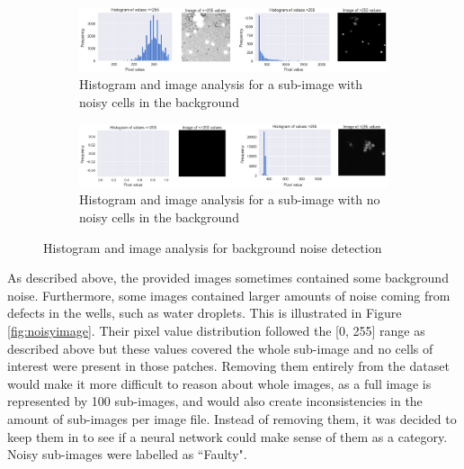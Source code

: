 \begin{figure}[h!]
    \centering
    \begin{subfigure}[h!]{0.99\textwidth}
        \includegraphics[width=\textwidth]{dissertation/figures/background_noise_true.png}
        \caption{Histogram and image analysis for a sub-image with noisy cells in the background}
        \label{fig:bgnoisetrue}
    \end{subfigure}

    \begin{subfigure}[h!]{0.99\textwidth}
        \includegraphics[width=\textwidth]{dissertation/figures/background_noise_false.png}
        \caption{Histogram and image analysis for a sub-image with no noisy cells in the background}
        \label{fig:bgnoisefalse}
    \end{subfigure}

    \caption{Histogram and image analysis for background noise detection}
    \label{fig:bgnoise}

\end{figure}

As described above, the provided images sometimes contained some background noise. Furthermore, some images contained larger amounts of noise coming from defects in the wells, such as water droplets. This is illustrated in Figure \ref{fig:noisyimage}. Their pixel value distribution followed the [0, 255] range as described above but these values covered the whole sub-image and no cells of interest were present in those patches. Removing them entirely from the dataset would make it more difficult to reason about whole images, as a full image is represented by 100 sub-images, and would also create inconsistencies in the amount of sub-images per image file. Instead of removing them, it was decided to keep them in to see if a neural network could make sense of them as a category. Noisy sub-images were labelled as ``Faulty".


